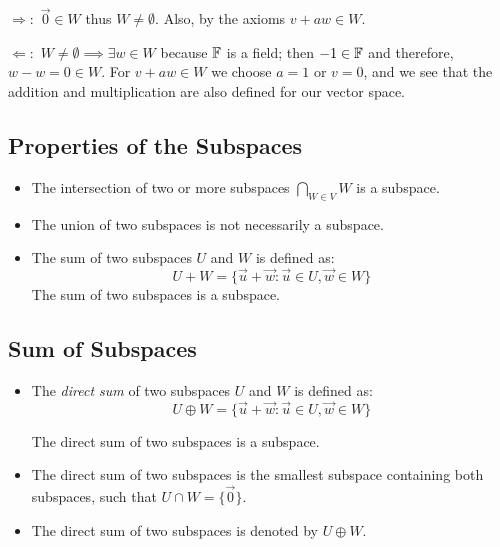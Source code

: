 \(\Rightarrow :\) \(\vec{0} \in W\) thus \(W \ne \emptyset\). Also, by the axioms
\(v + aw \in W\).

\(\Leftarrow:\) \(W \ne \emptyset \implies \exists w \in W\) because \(\mathbb{F}\) is a field; then \(-1 \in \mathbb{F}\) and therefore,
\(w - w = 0 \in W\). For \(v + aw \in W\) we choose \(a = 1\) or \(v = 0\), and we see that the addition and multiplication are also defined
for our vector space.

\subsection{Properties of the Subspaces}

\begin{itemize}

	\item The intersection of two or more subspaces \(\bigcap_{W \in V} W \) is a subspace.

	\item The union of two subspaces is not necessarily a subspace.

	\item The sum of two subspaces \(U\) and \(W\) is defined as:
	      \[
		      U + W = \{\vec{u} + \vec{w} : \vec{u} \in U, \vec{w} \in W\}
	      \]
	      The sum of two subspaces is a subspace.

\end{itemize}

\subsection{Sum of Subspaces}

\begin{itemize}

	\item The \emph{direct sum} of two subspaces \(U\) and \(W\) is defined as:
	      \[
		      U \oplus W = \{\vec{u} + \vec{w} : \vec{u} \in U, \vec{w} \in W\}
	      \]

	      The direct sum of two subspaces is a subspace.

	\item The direct sum of two subspaces is the smallest subspace containing both subspaces, such that
	      \(U \cap W = \{\vec{0}\}\).

	\item The direct sum of two subspaces is denoted by \(U \oplus W\).

\end{itemize}

